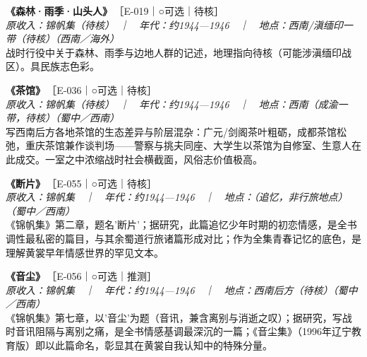 \documentclass[UTF8,fontset=none,zihao=-4,a4paper]{ctexart}
\begin{document}
\par\vspace{5pt}
\noindent\textbf{《森林·雨季·山头人》}\,{\small ［E-019｜○可选｜待核］}\\
{\small\itshape 原收入：锦帆集（待核）　｜　年代：约1944—1946　｜　地点：西南/滇缅印一带（待核）（西南／海外）}\\
战时行役中关于森林、雨季与边地人群的记述，地理指向待核（可能涉滇缅印战区）。具民族志色彩。
\par\vspace{5pt}
\noindent\textbf{《茶馆》}\,{\small ［E-036｜○可选｜待核］}\\
{\small\itshape 原收入：锦帆集（待核）　｜　年代：约1944—1946　｜　地点：西南（成渝一带，待核）（蜀中／西南）}\\
写西南后方各地茶馆的生态差异与阶层混杂：广元/剑阁茶叶粗砺，成都茶馆松弛，重庆茶馆兼作谈判场——警察与挑夫同座、大学生以茶馆为自修室、生意人在此成交。一室之中浓缩战时社会横截面，风俗志价值极高。
\par\vspace{5pt}
\noindent\textbf{《断片》}\,{\small ［E-055｜○可选｜待核］}\\
{\small\itshape 原收入：锦帆集　｜　年代：约1944—1946　｜　地点：（追忆，非行旅地点）（蜀中／西南）}\\
《锦帆集》第二章，题名'断片'；据研究，此篇追忆少年时期的初恋情感，是全书调性最私密的篇目，与其余蜀道行旅诸篇形成对比；作为全集青春记忆的底色，是理解黄裳早年情感世界的罕见文本。
\par\vspace{5pt}
\noindent\textbf{《音尘》}\,{\small ［E-056｜○可选｜推测］}\\
{\small\itshape 原收入：锦帆集　｜　年代：约1944—1946　｜　地点：西南后方（待核）（蜀中／西南）}\\
《锦帆集》第七章，以'音尘'为题（音讯，兼含离别与消逝之叹）；据研究，写战时音讯阻隔与离别之痛，是全书情感基调最深沉的一篇；《音尘集》（1996年辽宁教育版）即以此篇命名，彰显其在黄裳自我认知中的特殊分量。
\par\vspace{5pt}
\end{document}
